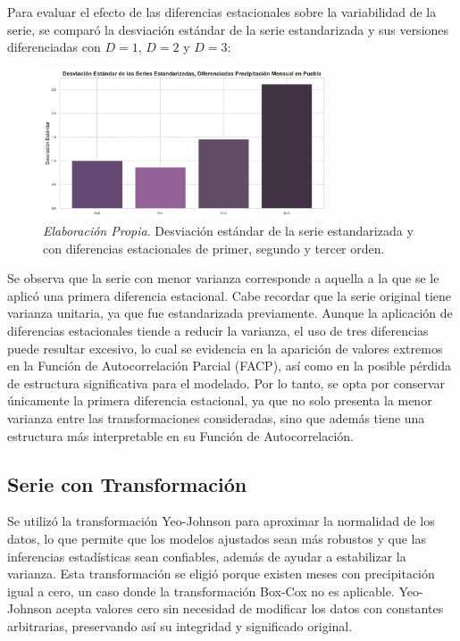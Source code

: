 \documentclass[12pt,letterpaper]{article}   %
\begin{document}
Para evaluar el efecto de las diferencias estacionales sobre la variabilidad de la serie, se comparó la desviación estándar de la serie estandarizada y sus versiones diferenciadas con $D=1$, $D=2$ y $D=3$:

\begin{figure}[h!]
\centering
\includegraphics[width=0.75\textwidth]{imagenes/03-05-std-Ds.pdf}
\caption{\textit{Elaboración Propia}. Desviación estándar de la serie estandarizada y con diferencias estacionales de primer, segundo y tercer orden.}
\end{figure}

Se observa que la serie con menor varianza corresponde a aquella a la que se le aplicó una primera diferencia estacional. Cabe recordar que la serie original tiene varianza unitaria, ya que fue estandarizada previamente. Aunque la aplicación de diferencias estacionales tiende a reducir la varianza, el uso de tres diferencias puede resultar excesivo, lo cual se evidencia en la aparición de valores extremos en la Función de Autocorrelación Parcial (FACP), así como en la posible pérdida de estructura significativa para el modelado.
Por lo tanto, se opta por conservar únicamente la primera diferencia estacional, ya que no solo presenta la menor varianza entre las transformaciones consideradas, sino que además tiene una estructura más interpretable en su Función de Autocorrelación.






















\newpage
\subsection{Serie con Transformación}
Se utilizó la transformación Yeo-Johnson para aproximar la normalidad de los datos, lo que permite que los modelos ajustados sean más robustos y que las inferencias estadísticas sean confiables, además de ayudar a estabilizar la varianza. Esta transformación se eligió porque existen meses con precipitación igual a cero, un caso donde la transformación Box-Cox no es aplicable. Yeo-Johnson acepta valores cero sin necesidad de modificar los datos con constantes arbitrarias, preservando así su integridad y significado original.
\end{document}
